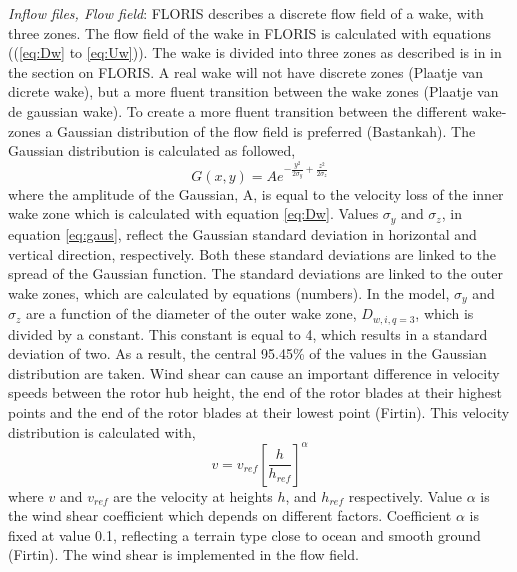 \documentclass[twoside,twocolumn]{article}
\begin{document}
\textit{Inflow files, Flow field}: FLORIS describes a discrete flow field of a wake, with three zones. The flow field of the wake in FLORIS is calculated with equations ((\ref{eq:Dw} to \ref{eq:Uw})). The wake is divided into three zones as described is in in the section on FLORIS. A real wake will not have discrete zones (Plaatje van dicrete wake), but a more fluent transition between the wake zones (Plaatje van de gaussian wake). To create a more fluent transition between the different wake-zones a Gaussian distribution of the flow field is preferred (Bastankah). The Gaussian distribution is calculated as followed, 
\begin{equation}
\label{eq:gaus}
G(x, y) = A e^{-\frac{y^2}{2\sigma_y} + \frac{z^2}{2\sigma_z}}
\end{equation}
where the amplitude of the Gaussian, A, is equal to the velocity loss of the inner wake zone which is calculated with equation \ref{eq:Dw}. Values $\sigma_y$ and $\sigma_z$, in equation \ref{eq:gaus}, reflect the Gaussian standard deviation in horizontal and vertical direction, respectively. Both these standard deviations are linked to the spread of the Gaussian function. The standard deviations are linked to the outer wake zones, which are calculated by equations (numbers). In the model, $\sigma_y$ and $\sigma_z$ are a function of the diameter of the outer wake zone,  $D_{w,i,q=3}$, which is divided by a constant. This constant is equal to 4, which results in a standard deviation of two. As a result, the central 95.45\% of the values in the Gaussian distribution are taken. 
Wind shear can cause an important difference in velocity speeds between the rotor hub height, the end of the rotor blades at their highest points and the end of the rotor blades at their lowest point (Firtin). This velocity distribution is calculated with, 
\begin{equation}
\label{eq:shear}
v = v_{ref} \left[\frac{h}{h_{ref}}\right]^\alpha
\end{equation}
where $v$ and $v_{ref}$ are the velocity at heights $h$, and $h_{ref}$  respectively. Value $\alpha$ is the wind shear coefficient which depends on different factors. Coefficient $\alpha$ is fixed at value 0.1, reflecting a terrain type close to ocean and smooth ground (Firtin). The wind shear is implemented in the flow field.
\end{document}
